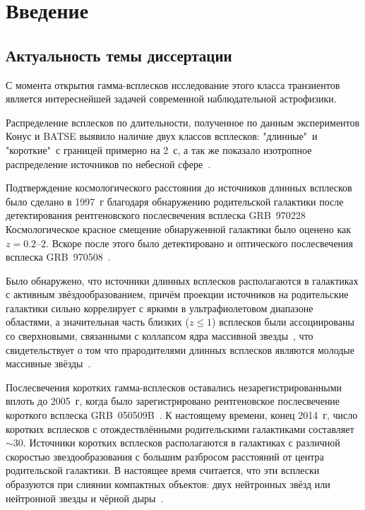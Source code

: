 \chapter{Введение}					
	
\section{Актуальность темы диссертации}
С момента открытия гамма-всплесков исследование этого класса транзиентов
является интереснейшей задачей современной наблюдательной астрофизики.

Распределение всплесков по длительности, полученное по данным экспериментов 
Конус и BATSE выявило наличие двух классов всплесков: "длинные"\ и "короткие"\ 
с границей примерно на 2~с, а так же показало изотропное распределение источников 
по небесной сфере~\citep{Mazets_1981_part_1, Briggs_1993ApJ}.  

Подтверждение космологического расстояния до источников длинных всплесков 
было сделано в 1997~г благодаря обнаружению родительской галактики после детектирования 
рентгеновского послесвечения всплеска GRB~970228~\citep{Costa1997Natur, van_Paradijs_1997Natur} 
Космологическое красное смещение обнаруженной галактики было оценено как $z=0.2\textrm{--}2$.
Вскоре после этого было детектировано и оптического послесвечения 
всплеска GRB~970508~\citep{Djorgovski1997Natur}. 

Было обнаружено, что источники длинных всплесков располагаются в галактиках 
с активным звёздообразованием, причём проекции источников на родительские галактики сильно
коррелирует с яркими в ультрафиолетовом диапазоне областями, а значительная часть 
близких ($z \le 1$) всплесков были ассоциированы со сверхновыми, связанными с 
коллапсом ядра массивной звезды~\citep{Hjorth_and_Bloom_2012book},
что свидетельствует о том что прародителями длинных всплесков являются молодые 
массивные звёзды~\citep[см. обзор][]{Berger_2014}.

Послесвечения коротких гамма-всплесков оставались незарегистрированными вплоть 
до 2005~г, когда было зарегистрировано рентгеновское послесвечение короткого 
всплеска GRB~050509B~\citep{Gehrels_2005Natur}. К настоящему времени, конец 2014~г, 
число коротких всплесков с отождествлёнными родительскими галактиками составляет $\sim 30$. 
Источники коротких всплесков располагаются в галактиках с различной скоростью 
звездообразования с большим разбросом расстояний от центра родительской галактики. 
В настоящее время считается, что эти всплески образуются при слиянии компактных 
объектов: двух нейтронных звёзд или нейтронной звезды и чёрной дыры~\citep{}.

